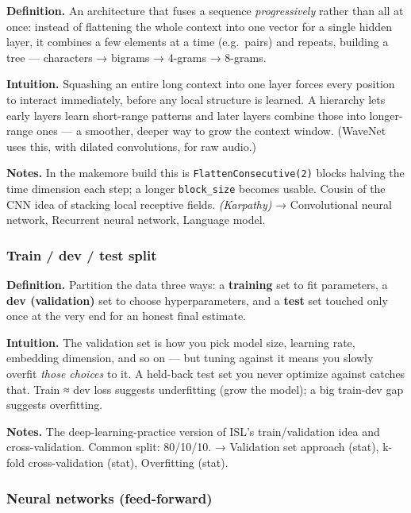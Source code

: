 \documentclass[
  10pt,
  letterpaper,
  onecolumn]{article}
\begin{document}
\textbf{Definition.} An architecture that fuses a sequence
\emph{progressively} rather than all at once: instead of flattening the
whole context into one vector for a single hidden layer, it combines a
few elements at a time (e.g.~pairs) and repeats, building a tree ---
characters → bigrams → 4-grams → 8-grams.

\textbf{Intuition.} Squashing an entire long context into one layer
forces every position to interact immediately, before any local
structure is learned. A hierarchy lets early layers learn short-range
patterns and later layers combine those into longer-range ones --- a
smoother, deeper way to grow the context window. (WaveNet uses this,
with dilated convolutions, for raw audio.)

\textbf{Notes.} In the makemore build this is
\texttt{FlattenConsecutive(2)} blocks halving the time dimension each
step; a longer \texttt{block\_size} becomes usable. Cousin of the CNN
idea of stacking local receptive fields. \emph{(Karpathy)} →
Convolutional neural network, Recurrent neural network, Language model.

\hypertarget{train-dev-test-split}{%
\subsubsection{Train / dev / test split}\label{train-dev-test-split}}

\textbf{Definition.} Partition the data three ways: a \textbf{training}
set to fit parameters, a \textbf{dev (validation)} set to choose
hyperparameters, and a \textbf{test} set touched only once at the very
end for an honest final estimate.

\textbf{Intuition.} The validation set is how you pick model size,
learning rate, embedding dimension, and so on --- but tuning against it
means you slowly overfit \emph{those choices} to it. A held-back test
set you never optimize against catches that. Train ≈ dev loss suggests
underfitting (grow the model); a big train-dev gap suggests overfitting.

\textbf{Notes.} The deep-learning-practice version of ISL's
train/validation idea and cross-validation. Common split: 80/10/10. →
Validation set approach (stat), k-fold cross-validation (stat),
Overfitting (stat).

\hypertarget{neural-networks-feed-forward}{%
\subsubsection{Neural networks
(feed-forward)}\label{neural-networks-feed-forward}}
\end{document}
